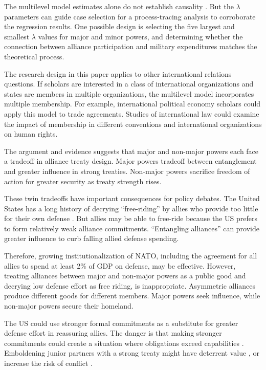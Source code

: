 \documentclass[12pt]{article}
\begin{document}
The multilevel model estimates alone do not establish causality \citep{Seawright2016}. 
But the $\lambda$ parameters can guide case selection for a process-tracing analysis to corroborate the regression results.
One possible design is selecting the five largest and smallest $\lambda$ values for major and minor powers, and determining whether the connection between alliance participation and military expenditures matches the theoretical process.


The research design in this paper applies to other international relations questions.
If scholars are interested in a class of international organizations and states are members in multiple organizations, the multilevel model incorporates multiple membership.
For example, international political economy scholars could apply this model to trade agreements. 
Studies of international law could examine the impact of membership in different conventions and international organizations on human rights. 


The argument and evidence suggests that major and non-major powers each face a tradeoff in alliance treaty design. 
Major powers tradeoff between entanglement and greater influence in strong treaties. 
Non-major powers sacrifice freedom of action for greater security as treaty strength rises. 


These twin tradeoffs have important consequences for policy debates.
The United States has a long history of decrying ``free-riding'' by allies who provide too little for their own defense \citep{Lanoszka2015}. 
But allies may be able to free-ride because the US prefers to form relatively weak alliance commitments. 
``Entangling alliances'' can provide greater influence to curb falling allied defense spending. 

 
Therefore, growing institutionalization of NATO, including the agreement for all allies to spend at least 2\% of GDP on defense, may be effective. 
However, treating alliances between major and non-major powers as a public good and decrying low defense effort as free riding, is inappropriate. 
Asymmetric alliances produce different goods for different members. 
Major powers seek influence, while non-major powers secure their homeland. 


The US could use stronger formal commitments as a substitute for greater defense effort in reassuring allies.
The danger is that making stronger commitments could create a situation where obligations exceed capabilities \citep{Kennedy1987}. 
Emboldening junior partners with a strong treaty might have deterrent value \citep{Bensonetal2014}, or increase the risk of conflict \citep{Benson2012}. 
\end{document}
